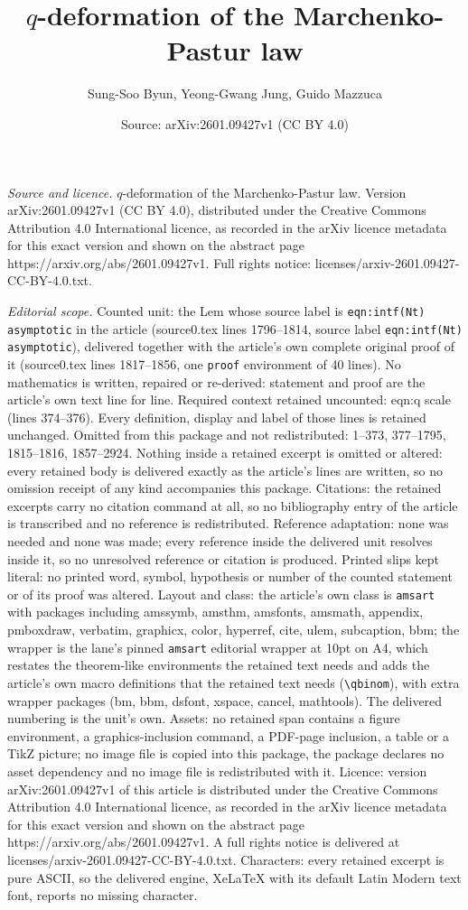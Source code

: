 \documentclass[10pt,a4paper]{amsart}
\title[$q$-deformation of the Marchenko-Pastur law]{$q$-deformation of the Marchenko-Pastur law}
\author{Sung-Soo Byun, Yeong-Gwang Jung, Guido Mazzuca}
\date{Source: arXiv:2601.09427v1 (CC BY 4.0)}
\begin{document}
\maketitle

\noindent\emph{Source and licence.} $q$-deformation of the Marchenko-Pastur law. Version arXiv:2601.09427v1 (CC BY 4.0), distributed under the Creative Commons Attribution 4.0 International licence, as recorded in the arXiv licence metadata for this exact version and shown on the abstract page https://arxiv.org/abs/2601.09427v1. Full rights notice: licenses/arxiv-2601.09427-CC-BY-4.0.txt.\par\smallskip

\noindent\textit{Editorial scope.} Counted unit: the Lem whose source label is \texttt{eqn:intf(Nt) asymptotic} in the article (source0.tex lines 1796--1814, source label \texttt{eqn:intf(Nt) asymptotic}), delivered together with the article's own complete original proof of it (source0.tex lines 1817--1856, one \texttt{proof} environment of 40 lines). No mathematics is written, repaired or re-derived: statement and proof are the article's own text line for line. Required context retained uncounted: eqn:q scale (lines 374--376). Every definition, display and label of those lines is retained unchanged. Omitted from this package and not redistributed: 1--373, 377--1795, 1815--1816, 1857--2924. Nothing inside a retained excerpt is omitted or altered: every retained body is delivered exactly as the article's lines are written, so no omission receipt of any kind accompanies this package. Citations: the retained excerpts carry no citation command at all, so no bibliography entry of the article is transcribed and no reference is redistributed. Reference adaptation: none was needed and none was made; every reference inside the delivered unit resolves inside it, so no unresolved reference or citation is produced. Printed slips kept literal: no printed word, symbol, hypothesis or number of the counted statement or of its proof was altered. Layout and class: the article's own class is \texttt{amsart} with packages including amssymb, amsthm, amsfonts, amsmath, appendix, pmboxdraw, verbatim, graphicx, color, hyperref, cite, ulem, subcaption, bbm; the wrapper is the lane's pinned \texttt{amsart} editorial wrapper at 10pt on A4, which restates the theorem-like environments the retained text needs and adds the article's own macro definitions that the retained text needs (\texttt{\textbackslash qbinom}), with extra wrapper packages (bm, bbm, dsfont, xspace, cancel, mathtools). The delivered numbering is the unit's own. Assets: no retained span contains a figure environment, a graphics-inclusion command, a PDF-page inclusion, a table or a TikZ picture; no image file is copied into this package, the package declares no asset dependency and no image file is redistributed with it. Licence: version arXiv:2601.09427v1 of this article is distributed under the Creative Commons Attribution 4.0 International licence, as recorded in the arXiv licence metadata for this exact version and shown on the abstract page https://arxiv.org/abs/2601.09427v1. A full rights notice is delivered at licenses/arxiv-2601.09427-CC-BY-4.0.txt. Characters: every retained excerpt is pure ASCII, so the delivered engine, XeLaTeX with its default Latin Modern text font, reports no missing character.
\end{document}
